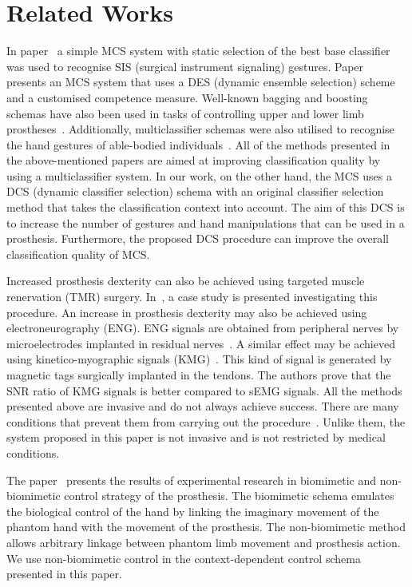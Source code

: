 \section{Related Works}
\label{sec:RelWorks} 

In paper~\cite{Freitas2023} a simple MCS system with static selection of the best base classifier was used to recognise SIS (surgical instrument signaling) gestures. Paper~\cite{Kurzynski2017} presents an MCS system that uses a DES (dynamic ensemble selection) scheme and a customised competence measure. Well-known bagging and boosting schemas have also been used in tasks of controlling upper and lower limb prostheses~\cite{Akbulut2022}. Additionally, multiclassifier schemas were also utilised to recognise the hand gestures of able-bodied individuals~\cite{Subasi2020}. All of the methods presented in the above-mentioned papers are aimed at improving classification quality by using a multiclassifier system. In our work, on the other hand, the MCS uses a DCS (dynamic classifier selection) schema with an original classifier selection method that takes the classification context into account. The aim of this DCS is to increase the number of gestures and hand manipulations that can be used in a prosthesis. Furthermore, the proposed DCS procedure can improve the overall classification quality of MCS.

Increased prosthesis dexterity can also be achieved using targeted muscle renervation (TMR) surgery. In~\cite{Simon2023}, a case study is presented investigating this procedure. An increase in prosthesis dexterity may also be achieved using electroneurography (ENG). ENG signals are obtained from peripheral nerves by microelectrodes implanted in residual nerves~\cite{Nguyen2020}. A similar effect may be achieved using kinetico-myographic signals (KMG)~\cite{Moradi2022}. This kind of signal is generated by magnetic tags surgically implanted in the tendons. The authors prove that the SNR ratio of KMG signals is better compared to sEMG signals. All the methods presented above are invasive and do not always achieve success. There are many conditions that prevent them from carrying out the procedure~\cite{Rask2023}. Unlike them, the system proposed in this paper is not invasive and is not restricted by medical conditions.

The paper~\cite{Schone2023} presents the results of experimental research in biomimetic and non-biomimetic control strategy of the prosthesis. The biomimetic schema emulates the biological control of the hand by linking the imaginary movement of the phantom hand with the movement of the prosthesis. The non-biomimetic method allows arbitrary linkage between phantom limb movement and prosthesis action. We use non-biomimetic control in the context-dependent control schema presented in this paper.


